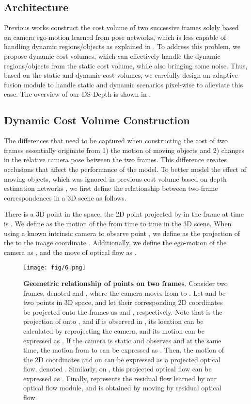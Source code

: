 \documentclass[journal]{IEEEtran}
\begin{document}
\subsection{Architecture}
Previous works \cite{manydepth,wimbauer2021monorec} construct the cost volume of two successive frames solely based on camera ego-motion learned from pose networks, which is less capable of handling dynamic regions/objects as explained in .
To address this problem, we propose dynamic cost volumes, which can effectively handle the dynamic regions/objects from the static cost volume, while also bringing some noise. Thus, based on the static and dynamic cost volumes, we carefully design an adaptive fusion module to handle static and dynamic scenarios pixel-wise to alleviate this case. The overview of our DS-Depth is shown in .

\subsection{Dynamic Cost Volume Construction}
\label{sec:4.1}
The differences that need to be captured when constructing the cost of two frames essentially originate from 1) the motion of moving objects and 2) changes in the relative camera pose between the two frames. This difference creates occlusions that affect the performance of the model. To better model the effect of moving objects, which was ignored in previous cost volume based on depth estimation networks \cite{manydepth}, we first define the relationship between two-frame correspondences in a 3D scene as follows.

There is a 3D point  in the space, the 2D point projected by  in the frame  at time  is . We define  as the motion of the  from time  to time  in the 3D scene. When using a known intrinsic camera to observe point , we define  as the projection of the  to the image coordinate . Additionally, we define the ego-motion of the camera as , and the move of optical flow as .

\begin{figure}[t]
\centering
\texttt{[image: fig/6.png]}
\caption{\textbf{Geometric relationship of points on two frames}. 
Consider two frames, denoted  and , where the camera moves from  to . Let  and  be two points in 3D space, and let their corresponding 2D coordinates be projected onto the frames as  and , respectively. Note that  is the projection of  onto , and if  is observed in , its location can be calculated by reprojecting the camera, and its motion can be expressed as . If the camera is static and observes  and  at the same time, the motion from  to  can be expressed as . Then, the motion of the 2D coordinates  and  on  can be expressed as a projected optical flow, denoted . Similarly, on , this projected optical flow can be expressed as . Finally,  represents the residual flow learned by our optical flow module, and  is obtained by moving  by residual optical flow.}
\label{fig:2}
\end{figure}
\end{document}
